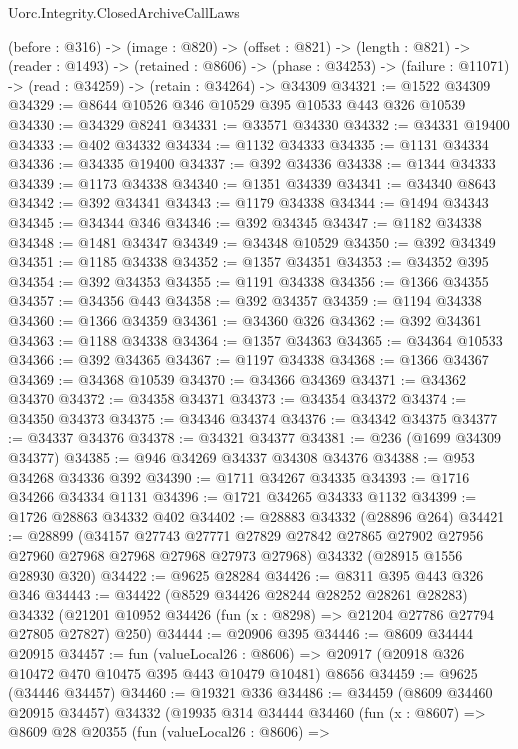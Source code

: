 \begin{lexlean}{Uorc.Integrity.ClosedArchiveCallLaws}
\begin{coremodule}
  (before : @316) ->
  (image : @820) ->
  (offset : @821) ->
  (length : @821) ->
  (reader : @1493) ->
  (retained : @8606) ->
  (phase : @34253) -> (failure : @11071) -> (read : @34259) -> (retain : @34264) -> @34309
@34321 := @1522 @34309
@34329 := @8644 @10526 @346 @10529 @395 @10533 @443 @326 @10539
@34330 := @34329 @8241
@34331 := @33571 @34330
@34332 := @34331 @19400
@34333 := @402 @34332
@34334 := @1132 @34333
@34335 := @1131 @34334
@34336 := @34335 @19400
@34337 := @392 @34336
@34338 := @1344 @34333
@34339 := @1173 @34338
@34340 := @1351 @34339
@34341 := @34340 @8643
@34342 := @392 @34341
@34343 := @1179 @34338
@34344 := @1494 @34343
@34345 := @34344 @346
@34346 := @392 @34345
@34347 := @1182 @34338
@34348 := @1481 @34347
@34349 := @34348 @10529
@34350 := @392 @34349
@34351 := @1185 @34338
@34352 := @1357 @34351
@34353 := @34352 @395
@34354 := @392 @34353
@34355 := @1191 @34338
@34356 := @1366 @34355
@34357 := @34356 @443
@34358 := @392 @34357
@34359 := @1194 @34338
@34360 := @1366 @34359
@34361 := @34360 @326
@34362 := @392 @34361
@34363 := @1188 @34338
@34364 := @1357 @34363
@34365 := @34364 @10533
@34366 := @392 @34365
@34367 := @1197 @34338
@34368 := @1366 @34367
@34369 := @34368 @10539
@34370 := @34366 @34369
@34371 := @34362 @34370
@34372 := @34358 @34371
@34373 := @34354 @34372
@34374 := @34350 @34373
@34375 := @34346 @34374
@34376 := @34342 @34375
@34377 := @34337 @34376
@34378 := @34321 @34377
@34381 := @236 (@1699 @34309 @34377)
@34385 := @946 @34269 @34337 @34308 @34376
@34388 := @953 @34268 @34336 @392
@34390 := @1711 @34267 @34335
@34393 := @1716 @34266 @34334 @1131
@34396 := @1721 @34265 @34333 @1132
@34399 := @1726 @28863 @34332 @402
@34402 := @28883 @34332 (@28896 @264)
@34421 := @28899
    (@34157
      @27743
      @27771
      @27829
      @27842
      @27865
      @27902
      @27956
      @27960
      @27968
      @27968
      @27968
      @27973
      @27968)
    @34332
    (@28915 @1556 @28930 @320)
@34422 := @9625 @28284
@34426 := @8311 @395 @443 @326 @346
@34443 := @34422
    (@8529 @34426 @28244 @28252 @28261 @28283)
    @34332
    (@21201 @10952 @34426 (fun (x : @8298) => @21204 @27786 @27794 @27805 @27827) @250)
@34444 := @20906 @395
@34446 := @8609 @34444 @20915
@34457 := fun (valueLocal26 : @8606) =>
  @20917 (@20918 @326 @10472 @470 @10475 @395 @443 @10479 @10481) @8656
@34459 := @9625 (@34446 @34457)
@34460 := @19321 @336
@34486 := @34459
    (@8609 @34460 @20915 @34457)
    @34332
    (@19935
      @314
      @34444
      @34460
      (fun (x : @8607) =>
      @8609
        @28
        @20355
        (fun (valueLocal26 : @8606) =>

\end{coremodule}
\end{lexlean}
